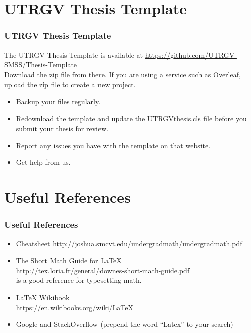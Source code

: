 \documentclass{beamer}
\begin{document}
\section{UTRGV Thesis Template}
\begin{frame}
  \frametitle{UTRGV Thesis Template}
  The UTRGV Thesis Template is available at
  \url{https://github.com/UTRGV-SMSS/Thesis-Template}\\

  Download the zip file from there.  If you are using a service such
  as Overleaf,  upload the zip file to create a new project.

  \begin{itemize}
      \item
        Backup your files regularly.
      \item
        Redownload the template and update
        the UTRGVthesis.cls file before you submit your thesis for review.
      \item
        Report any issues you have with the template on that website.
      \item
        Get help from us.
  \end{itemize}

\end{frame}


\section{Useful References}
\begin{frame}
  \frametitle{Useful References}


  \begin{itemize}
    \item
      Cheatsheet
      \url{http://joshua.smcvt.edu/undergradmath/undergradmath.pdf}

    \item
      The Short Math Guide for \LaTeX{}\\
      \url{http://tex.loria.fr/general/downes-short-math-guide.pdf}\\
      is a good reference for typesetting math.

    \item
      \LaTeX{} Wikibook\\
      \url{https://en.wikibooks.org/wiki/LaTeX}

      \item
        Google and StackOverflow (prepend the word ``Latex'' to your search)
  \end{itemize}

\end{frame}
\end{document}
